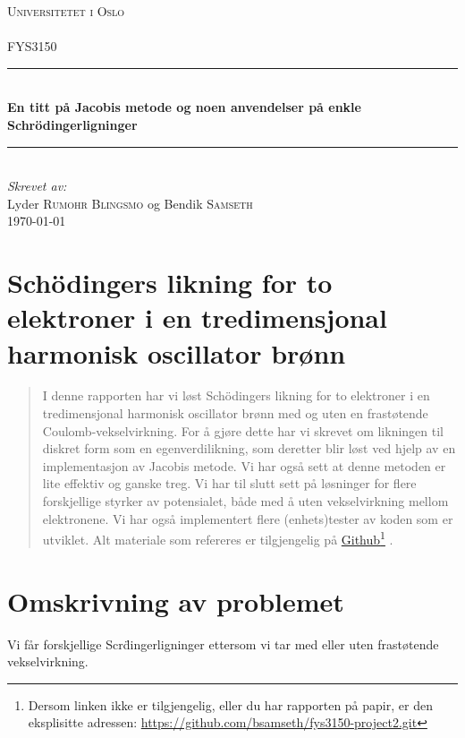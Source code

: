 \documentclass[11pt]{article}
\begin{document}
\begin{titlepage}
  \newcommand{\HRule}{\rule{\linewidth}{0.5mm}}
  \center
  \textsc{\LARGE Universitetet i Oslo}\\[1.5cm] %
  \textsc{\Large }\\[0.5cm] %
  \textsc{\large FYS3150}\\[0.5cm] %
  \HRule \\[0.4cm]
  { \huge \bfseries En titt på Jacobis metode og noen anvendelser på enkle Schr\"odingerligninger}\\[0.4cm] %
  \HRule \\[1.5cm]
  \Large \emph{Skrevet av:}\\
  Lyder \textsc{Rumohr Blingsmo} og Bendik \textsc{Samseth}\\[3cm]
  {\large \today}\\[3cm]
  \vfill
\end{titlepage}


\section*{Schödingers likning for to elektroner i en tredimensjonal
  harmonisk oscillator brønn}
\begin{abstract}
  I denne rapporten har vi løst Schödingers likning for to elektroner
  i en tredimensjonal harmonisk oscillator brønn med og uten en
  frastøtende Coulomb-vekselvirkning. For å gjøre dette har vi skrevet om
  likningen til diskret form som en egenverdilikning, som deretter blir
  løst ved hjelp av en implementasjon av Jacobis metode. Vi har også
  sett at denne metoden er lite effektiv og ganske treg. Vi har til
  slutt sett på løsninger for flere forskjellige styrker av
  potensialet, både med å uten vekselvirkning mellom elektronene. Vi
  har også implementert flere (enhets)tester av koden som er
  utviklet. Alt materiale som refereres er tilgjengelig på
  \href{https://github.com/bsamseth/fys3150-project2.git}{Github}\footnote{Dersom
    linken ikke er tilgjengelig, eller du har rapporten på papir, er den eksplisitte 
    adressen: \url{https://github.com/bsamseth/fys3150-project2.git}} .
\end{abstract}

\section{Omskrivning av problemet}
Vi får forskjellige Scr\"dingerligninger ettersom vi tar med eller uten frastøtende vekselvirkning.
\end{document}
